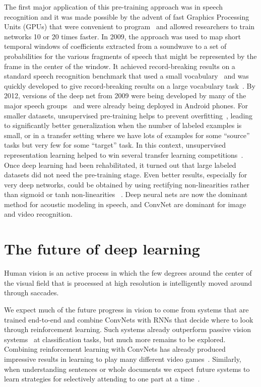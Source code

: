 \documentclass[10pts]{article}
\begin{document}
The first major application of this pre-training approach was in
speech recognition and it was made possible by the advent of fast
Graphics Processing Units (GPUs) that were convenient to
program~\citep{RainaICML09-small} and allowed researchers to train
networks 10 or 20 times faster.  In 2009, the approach was used to map
short temporal windows of coefficients extracted from a soundwave to a
set of probabilities for the various fragments of speech that might be
represented by the frame in the center of the window.  It achieved
record-breaking results on a standard speech recognition benchmark
that used a small vocabulary~\citep{TIMITpaper} and was quickly
developed to give record-breaking results on a large vocabulary
task~\citep{Dahl2012}.  By 2012, versions of the deep net from 2009
were being developed by many of the major speech
groups~\citep{Hinton-et-al-2012} and were already being deployed in
Android phones.  For smaller datasets, unsupervised pre-training helps
to prevent overfitting~\citep{Bengio-Courville-Vincent-TPAMI2013},
leading to significantly better generalization when the number of
labeled examples is small, or in a transfer setting where we have lots
of examples for some ``source'' tasks but very few for some ``target''
task. In this context, unsupervised representation learning helped to
win several transfer learning
competitions~\citep{Bengio-Courville-Vincent-TPAMI2013}.  Once deep
learning had been rehabilitated, it turned out that large labeled
datasets did not need the pre-training stage. Even better results,
especially for very deep networks, could be obtained by using
rectifying non-linearities rather than sigmoid or tanh non-linearities
~\citep{jarrett-iccv-09,Nair-2010-small,Glorot+al-AI-2011-small,Krizhevsky-2012-small,Dahl-et-al-ICASSP2013}. Deep
neural nets are now the dominant method for acoustic modeling in
speech, and ConvNet are dominant for image and video recognition.


\section{The future of deep learning}

Human vision is an active process in which the few degrees around the
center of the visual field that is processed at high resolution is
intelligently moved around through saccades.

We expect much of the future progress in vision to come from systems
that are trained end-to-end and combine ConvNets with RNNs that decide
where to look through reinforcement learning. Such systems already
outperform passive vision systems~\citep{ba+mnih} at classification
tasks, but much more remains to be explored.  Combining reinforcement
learning with ConvNets has already produced impressive results in
learning to play many different video games~\citep{Mnih-et-al-2015}.
Similarly, when understanding sentences or whole documents we expect
future systems to learn strategies for selectively attending to one
part at a time~\citep{Bahdanau-et-al-ICLR2015-small}. 
\end{document}
